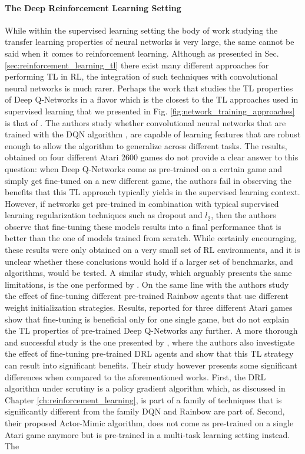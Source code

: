 \paragraph{The Deep Reinforcement Learning Setting}
While within the supervised learning setting the body of work studying the transfer learning properties of neural networks is very large, the same cannot be said when it comes to reinforcement learning. Although as presented in Sec. \ref{sec:reinforcement_learning_tl} there exist many different approaches for performing TL in RL, the integration of such techniques with convolutional neural networks is much rarer. Perhaps the work that studies the TL properties of Deep Q-Networks in a flavor which is the closest to the TL approaches used in supervised learning that we presented in Fig. \ref{fig:network_training_approaches} is that of \citet{farebrother2018generalization}. The authors study whether convolutional neural networks that are trained with the DQN algorithm \cite{mnih2015human}, are capable of learning features that are robust enough to allow the algorithm to generalize across different tasks. The results, obtained on four different Atari 2600 games do not provide a clear answer to this question: when Deep Q-Networks come as pre-trained on a certain game and simply get fine-tuned on a new different game, the authors fail in observing the benefits that this TL approach typically yields in the supervised learning context. However, if networks get pre-trained in combination with typical supervised learning regularization techniques such as dropout \cite{srivastava2014dropout} and $l_2$, then the authors observe that fine-tuning these models results into a final performance that is better than the one of models trained from scratch. While certainly encouraging, these results were only obtained on a very small set of RL environments, and it is unclear whether these conclusions would hold if a larger set of benchmarks, and algorithms, would be tested. A similar study, which arguably presents the same limitations, is the one performed by \citet{tyo2020transferable}. On the same line with \citet{farebrother2018generalization} the authors study the effect of fine-tuning different pre-trained Rainbow agents \cite{hessel2018rainbow} that use different weight initialization strategies. Results, reported for three different Atari games show that fine-tuning is beneficial only for one single game, but do not explain the TL properties of pre-trained Deep Q-Networks any further. A more thorough and successful study is the one presented by \citet{parisotto2015actor}, where the authors also investigate the effect of fine-tuning pre-trained DRL agents and show that this TL strategy can result into significant benefits. Their study however presents some significant differences when compared to the aforementioned works. First, the DRL algorithm under scrutiny is a policy gradient algorithm which, as discussed in Chapter \ref{ch:reinforcement_learning}, is part of a family of techniques that is significantly different from the family DQN and Rainbow are part of. Second, their proposed Actor-Mimic algorithm, does not come as pre-trained on a single Atari game anymore but is pre-trained in a multi-task learning setting instead. The 